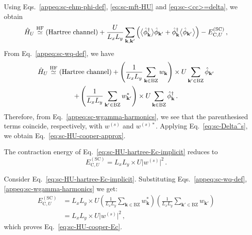 \begin{tabproof}
	
	Using Eqs.~\eqref{appeq:sc-ehm-phi-def}, \eqref{eq:sc-mft-HU} and \eqref{eq:sc-<cc>=delta}, we obtain
	\begin{equation}\label{eq:sc-HU-<phi>-phi}
		\hat H_U \stackrel{\mathrm{HF}}{\simeq} \text{(Hartree channel)} + \frac{U}{L_x L_y} \sum_{\mathbf{k},\mathbf{k}'} \left(
		\big\langle
		\hat \phi_\mathbf{k}^\dagger
		\big\rangle \hat \phi_{\mathbf{k}'} + 
		\hat \phi_\mathbf{k}^\dagger \big\langle
		\hat \phi_{\mathbf{k}'}
		\big\rangle
		\right) - E_{\mathrm{C},U}^{(\mathrm{SC})} \, ,
	\end{equation}
	From Eq.~\eqref{appeq:sc-wq-def}, we have
	\begin{multline*}
		\hat H_U \stackrel{\mathrm{HF}}{\simeq} \text{(Hartree channel)} + \left(
		\frac{1}{L_x L_y} \sum_{\mathbf{k}\in\mathrm{BZ}} w_\mathbf{k}
		\right) \times U \sum_{\mathbf{k}'\in\mathrm{BZ}} \hat \phi_{\mathbf{k}'} \\
		+  \left(
		\frac{1}{L_x L_y} \sum_{\mathbf{k}'\in\mathrm{BZ}} w_{\mathbf{k}'}^*
		\right) \times U \sum_{\mathbf{k}\in\mathrm{BZ}} \hat \phi_\mathbf{k}^\dagger \, .
	\end{multline*}
	Therefore, from Eq.~\eqref{appeq:sc-wgamma-harmonics}, we see that the parenthesised terms coincide, respectively, with $w^{(s)}$ and $w^{(s)*}$. Applying Eq.~\eqref{eq:sc-Delta^s}, we obtain Eq.~\eqref{eq:sc-HU-cooper-approx}.	
\end{tabproof}

The contraction energy of Eq.~\eqref{eq:sc-HU-hartree-Ec-implicit} reduces to
\begin{equation}\label{eq:sc-HU-cooper-Ec}
	E_{\mathrm{C},U}^{(\mathrm{SC})}=L_x L_y \times U \big| w^{(s)} \big|^2 \, .
\end{equation}

\begin{tabproof}
	
	Consider Eq.~\eqref{eq:sc-HU-hartree-Ec-implicit}. Substituting Eqs.~\eqref{appeq:sc-wq-def}, \eqref{appeq:sc-wgamma-harmonics} we get:
	\begin{align}
		E_{\mathrm{C},U}^{(\mathrm{SC})} &= L_x L_y \times U \left(\frac{1}{L_x L_y} \sum_{\mathbf{k}\in\mathrm{BZ}} w_\mathbf{k}^*\right) \left(\frac{1}{L_x L_y} \sum_{\mathbf{k}'\in\mathrm{BZ}} w_{\mathbf{k}'}\right) \\
		&= L_x L_y \times U \big| w^{(s)} \big|^2 \, , \label{eq:sc-cooper-U-contraction-energy}
	\end{align}
	which proves Eq.~\eqref{eq:sc-HU-cooper-Ec}.
\end{tabproof}

